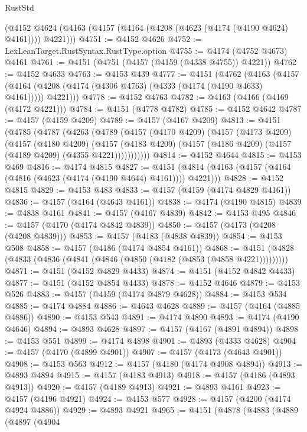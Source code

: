 \begin{lexlean}{RustStd}
\begin{coremodule}
    (@4152 @4624 (@4163 (@4157 (@4164 (@4208 (@4623 (@4174 (@4190 @4624) @4161)))) @4221)))
@4751 := @4152 @4626
@4752 := LexLeanTarget.RustSyntax.RustType.option
@4755 := @4174 (@4752 @4673) @4161
@4761 := @4151 (@4751 (@4157 (@4159 (@4338 @4755)) @4221))
@4762 := @4152 @4633
@4763 := @4153 @439
@4777 := @4151
    (@4762
      (@4163
        (@4157 (@4164 (@4208 (@4174 (@4306 @4763) (@4333 (@4174 (@4190 @4633) @4161))))) @4221)))
@4778 := @4152 @4763
@4782 := @4163 (@4166 (@4169 (@4172 @4221)))
@4784 := @4151 (@4778 @4782)
@4785 := @4152 @4642
@4787 := @4157 (@4159 @4209)
@4789 := @4157 (@4167 @4209)
@4813 := @4151
    (@4785
      (@4787
        (@4263
          (@4789
            (@4157
              (@4170 @4209)
              (@4157
                (@4173 @4209)
                (@4157
                  (@4180 @4209)
                  (@4157
                    (@4183 @4209)
                    (@4157 (@4186 @4209) (@4157 (@4189 @4209) (@4355 @4221)))))))))))
@4814 := @4152 @4644
@4815 := @4153 @469
@4816 := @4174 @4815
@4827 := @4151 (@4814 (@4163 (@4157 (@4164 (@4816 (@4623 (@4174 (@4190 @4644) @4161)))) @4221)))
@4828 := @4152 @4815
@4829 := @4153 @483
@4833 := @4157 (@4159 (@4174 @4829 @4161))
@4836 := @4157 (@4164 (@4643 @4161))
@4838 := @4174 (@4190 @4815)
@4839 := @4838 @4161
@4841 := @4157 (@4167 @4839)
@4842 := @4153 @495
@4846 := @4157 (@4170 (@4174 @4842 @4839))
@4850 := @4157 (@4173 (@4208 (@4208 @4839)))
@4853 := @4157 (@4183 (@4838 @4839))
@4854 := @4153 @508
@4858 := @4157 (@4186 (@4174 @4854 @4161))
@4868 := @4151 (@4828 (@4833 (@4836 (@4841 (@4846 (@4850 (@4182 (@4853 (@4858 @4221)))))))))
@4871 := @4151 (@4152 @4829 @4433)
@4874 := @4151 (@4152 @4842 @4433)
@4877 := @4151 (@4152 @4854 @4433)
@4878 := @4152 @4646
@4879 := @4153 @526
@4883 := @4157 (@4159 (@4174 @4879 @4628))
@4884 := @4153 @534
@4885 := @4174 @4884
@4886 := @4643 @4628
@4889 := @4157 (@4164 (@4885 @4886))
@4890 := @4153 @543
@4891 := @4174 @4890
@4893 := @4174 (@4190 @4646)
@4894 := @4893 @4628
@4897 := @4157 (@4167 (@4891 @4894))
@4898 := @4153 @551
@4899 := @4174 @4898
@4901 := @4893 (@4333 @4628)
@4904 := @4157 (@4170 (@4899 @4901))
@4907 := @4157 (@4173 (@4643 @4901))
@4908 := @4153 @563
@4912 := @4157 (@4180 (@4174 @4908 @4894))
@4913 := @4893 @4894
@4915 := @4157 (@4183 @4913)
@4918 := @4157 (@4186 (@4893 @4913))
@4920 := @4157 (@4189 @4913)
@4921 := @4893 @4161
@4923 := @4157 (@4196 @4921)
@4924 := @4153 @577
@4928 := @4157 (@4200 (@4174 @4924 @4886))
@4929 := @4893 @4921
@4965 := @4151
    (@4878
      (@4883
        (@4889
          (@4897
            (@4904

\end{coremodule}
\end{lexlean}
